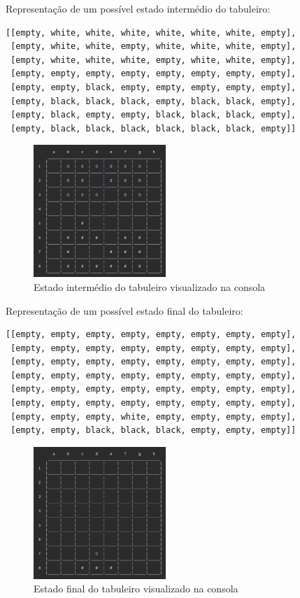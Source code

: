 \documentclass[a4paper]{article}
\begin{document}
\pagebreak
Representação de um possível estado intermédio do tabuleiro:
\begin{small}
\begin{lstlisting}
[[empty, white, white, white, white, white, white, empty],
 [empty, white, white, empty, white, white, white, empty],
 [empty, white, white, white, empty, white, white, empty],
 [empty, empty, empty, empty, empty, empty, empty, empty],
 [empty, empty, black, empty, empty, empty, empty, empty],
 [empty, black, black, black, empty, black, black, empty],
 [empty, black, empty, empty, black, black, black, empty],
 [empty, black, black, black, black, black, black, empty]]
\end{lstlisting}
\end{small}
\begin{figure}[h!]
	\centering
    \includegraphics[height=5cm,width=5cm]{res/intermedialBoard.png}
    \caption{Estado intermédio do tabuleiro visualizado na consola}
    \label{fig:9}
\end{figure}

Representação de um possível estado final do tabuleiro:
\begin{small}
\begin{lstlisting}
[[empty, empty, empty, empty, empty, empty, empty, empty],
 [empty, empty, empty, empty, empty, empty, empty, empty],
 [empty, empty, empty, empty, empty, empty, empty, empty],
 [empty, empty, empty, empty, empty, empty, empty, empty],
 [empty, empty, empty, empty, empty, empty, empty, empty],
 [empty, empty, empty, empty, empty, empty, empty, empty],
 [empty, empty, empty, white, empty, empty, empty, empty],
 [empty, empty, black, black, black, empty, empty, empty]]
\end{lstlisting}
\end{small}
\begin{figure}[h!]
	\centering
    \includegraphics[height=5cm,width=5cm]{res/finalBoard.png}
    \caption{Estado final do tabuleiro visualizado na consola}
    \label{fig:9}
\end{figure}
\end{document}
